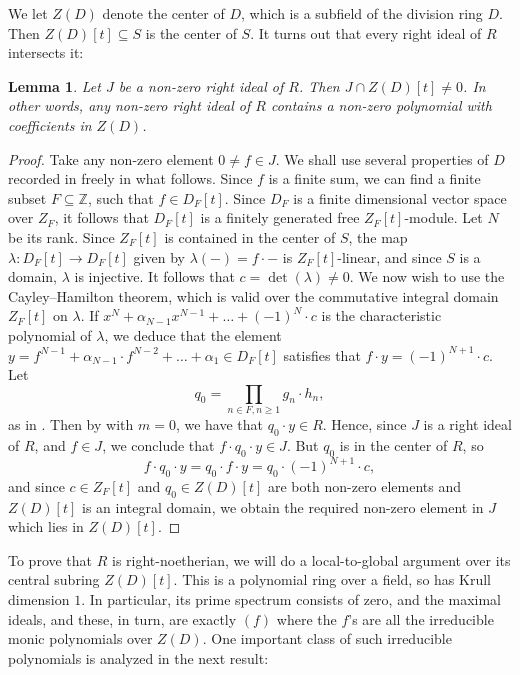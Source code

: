 \documentclass{amsart}
\newtheorem{lem}[equation]{Lemma}
\theoremstyle{definition}
\numberwithin{equation}{section}
\begin{document}
We let $Z(D)$ denote the center of $D$,
which is a subfield of the division ring $D$.
Then $Z(D)[t] \subseteq S$ is the center of $S$.
It turns out that every right ideal of $R$ intersects it:

\begin{lem}\label{lem:idealintersectcenter}
Let $J$ be a non-zero right ideal of $R$.
Then $J \cap Z(D)[t] \ne 0$.
In other words, any non-zero right ideal of $R$ contains a non-zero polynomial with coefficients in $Z(D)$.
\end{lem}
\begin{proof}
Take any non-zero element $0 \ne f \in J$.
We shall use several properties of $D$ recorded in  freely in what follows.
Since $f$ is a finite sum,
we can find a finite subset $F \subseteq \mathbb{Z}$,
such that $f \in D_F[t]$.
Since $D_F$ is a finite dimensional vector space over $Z_F$,
it follows that $D_F[t]$ is a finitely generated free $Z_F[t]$-module.
Let $N$ be its rank.
Since $Z_F[t]$ is contained in the center of $S$,
the map $\lambda:D_F[t] \to D_F[t]$ given by $\lambda(-) = f\cdot -$ is $Z_F[t]$-linear, and since $S$ is a domain, $\lambda$ is injective.
It follows that $c = \det(\lambda) \ne 0$.
We now wish to use the Cayley–Hamilton theorem,
which is valid over the commutative integral domain $Z_F[t]$ on $\lambda$.
If $x^N + \alpha_{N-1}x^{N-1} + \dots + (-1)^N \cdot c$ is the characteristic polynomial of $\lambda$,
we deduce that the element $y = f^{N-1}+\alpha_{N-1}\cdot f^{N-2} + \dots + \alpha_1 \in D_F[t]$ satisfies that $f\cdot y = (-1)^{N+1} \cdot c$.
Let 
\[
q_0 = \prod_{n\in F, n \ge 1} g_n \cdot h_n,
\]
as in .
Then by  with $m=0$,
we have that $q_0\cdot y \in R$.
Hence, since $J$ is a right ideal of $R$, and $f \in J$,
we conclude that $f\cdot q_0\cdot y\in J$.
But $q_0$ is in the center of $R$,
so
\[
f\cdot q_0 \cdot y = q_0 \cdot f\cdot y = q_0 \cdot (-1)^{N+1} \cdot c,
\]
and since $c \in Z_F[t]$ and $q_0 \in Z(D)[t]$ are both non-zero elements and $Z(D)[t]$ is an integral domain,
we obtain the required non-zero element in $J$ which lies in $Z(D)[t]$.
\end{proof}

To prove that $R$ is right-noetherian,
we will do a local-to-global argument over its central subring $Z(D)[t]$. This is a polynomial ring over a field, so has Krull dimension $1$.
In particular, its prime spectrum consists of zero, and the maximal ideals, and these, in turn, are exactly $(f)$ where the $f$'s are all the irreducible monic polynomials over $Z(D)$. One important class of such irreducible polynomials is analyzed in the next result:
 
\end{document}
